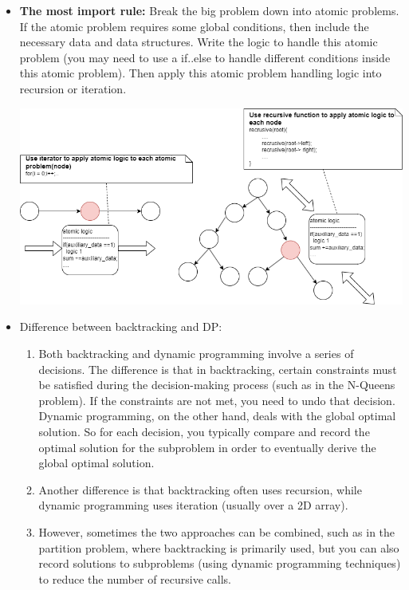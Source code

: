 \documentclass[a4paper,11pt,twoside]{book}
\begin{document}
\begin{itemize}
	
	\item \textbf{The most import rule:} Break the big problem down into atomic problems. If the atomic problem requires some global conditions, then include the necessary data and data structures. Write the logic to handle this atomic problem (you may need to use a if..else to handle different conditions inside this atomic problem). Then apply this atomic problem handling logic into recursion or iteration.

\begin{center}
	\includegraphics[scale=0.55]{pics/rule.drawio.png}
\end{center}

	\item Difference between backtracking and DP:
	\begin{enumerate}
		\item Both backtracking and dynamic programming involve a series of decisions. The difference is that in backtracking, certain constraints must be satisfied during the decision-making process (such as in the N-Queens problem). If the constraints are not met, you need to undo that decision. Dynamic programming, on the other hand, deals with the global optimal solution. So for each decision, you typically compare and record the optimal solution for the subproblem in order to eventually derive the global optimal solution.
		
		\item Another difference is that backtracking often uses recursion, while dynamic programming uses iteration (usually over a 2D array).
		
		\item However, sometimes the two approaches can be combined, such as in the partition problem, where backtracking is primarily used, but you can also record solutions to subproblems (using dynamic programming techniques) to reduce the number of recursive calls.
		

\end{enumerate}
\end{itemize}
\end{document}
